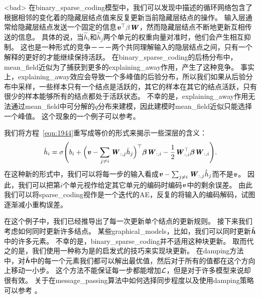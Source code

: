 <bad>
在\gls{binary_sparse_coding}模型中，我们可以发现中描述的循环网络包含了根据相邻的变化着的隐藏层结点值来反复更新当前隐藏层结点的操作。
输入层通常给隐藏层结点发送一个固定的信息$\boldsymbol{\mathit{v}}^{\top}\beta\boldsymbol{\mathit{W}}$，然而隐藏层结点不断地更新互相传送的信息。
具体的说，当$\hat{h}_i$和$\hat{h}_j$两个单元的权重向量对准时，他们会产生相互抑制。
这也是一种形式的竞争－－－两个共同理解输入的隐层结点之间，只有一个解释的更好的才能继续保持活跃。
在\gls{binary_sparse_coding}的后杨分布中，\gls{mean_field}近似为了捕获到更多的\gls{explaining_away}作用，产生了这种竞争。
事实上，\gls{explaining_away}效应会导致一个多峰值的后验分布，所以我们如果从后验分布中采样，一些样本只有一个结点是活跃的，其它的样本在其它的结点活跃，只有很少的样本能够所有的结点都处于活跃状态。
不幸的是，\gls{explaining_away}作用无法通过\gls{mean_field}中可分解的$q$分布来建模，因此建模时\gls{mean_field}近似只能选择一个峰值。
这个现象的一个例子可以参考。




我们将方程~\eqref{eqn:1944}重写成等价的形式来揭示一些深层的含义：
\begin{align}
\hat{h}_i = \sigma\Bigg(b_i + \Big(\boldsymbol{\mathit{v}} - \sum_{j\neq i} \boldsymbol{\mathit{W}}_{:,j}\hat{h}_j\Big)^{\top} {\boldsymbol{\beta}}\boldsymbol{\mathit{W}}_{:,i} - \frac{1}{2} \boldsymbol{\mathit{W}}_{:,i}^{\top} {\boldsymbol{\beta}} \boldsymbol{\mathit{W}}_{:,i}\Bigg). 
\end{align}
在这种新的形式中，我们可以将每一步的输入看成$\boldsymbol{\mathit{v}} - \sum_{j\neq i} \boldsymbol{\mathit{W}}_{:,j}\hat{h}_j$而不是$\boldsymbol{\mathit{v}}$。
因此，我们可以把第$i$个单元视作给定其它单元的编码时编码$\boldsymbol{\mathit{v}}$中的剩余误差。
由此我们可以将\gls{sparse_coding}视作是一个迭代的\gls{AE}，反复的将输入的编码解码，试图逐渐减小重构误差。


在这个例子中，我们已经推导出了每一次更新单个结点的更新规则。
接下来我们考虑如何同时更新许多结点。
某些\gls{graphical_models}，比如，我们可以同时更新$\hat{\boldsymbol{\mathit{h}}}$中的许多元素。
不幸的是，\gls{binary_sparse_coding}并不适用这种块更新。
取而代之的是，我们使用一种称为是的启发式的技巧来实现块更新。
在\gls{damping}方法中，对$\hat{\boldsymbol{\mathit{h}}}$中的每一个元素我们都可以解出最优值，然后对于所有的值都在这个方向上移动一小步。
这个方法不能保证每一步都能增加$\mathcal{L}$，但是对于许多模型来说却很有效。
关于在\gls{message_passing}算法中如何选择同步程度以及使用\gls{damping}策略可以参考\citet{koller-book2009} 。




\subsection{}
\label{sec:calculus_of_variations}

